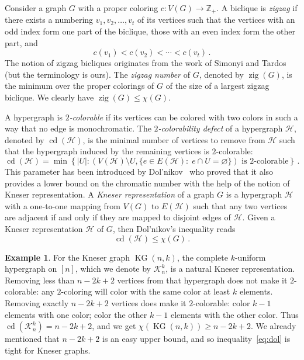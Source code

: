 \documentclass[12pt]{amsart}
\theoremstyle{definition}
\newtheorem{example}{Example}
\def\Z{\mathbb{Z}}
\def\HH{\mathcal{H}}
\renewcommand{\geq}{\geqslant}
\renewcommand{\leq}{\leqslant}
\def\KG{\operatorname{KG}}
\def\cd{\operatorname{cd}}
\def\zig{\operatorname{zig}}
\begin{document}

Consider a graph $G$ with a proper coloring $c \colon V(G) \rightarrow \Z_+$. A biclique is {\em zigzag} if there exists a numbering $v_1, v_2, \ldots, v_t$ of its vertices such that the vertices with an odd index form one part of the biclique, those with an even index form the other part, and 
\[
c(v_1) < c(v_2) < \cdots < c(v_t) \, .
\]
The notion of zigzag bicliques originates from the work of Simonyi and Tardos~\cite{simonyi2006local} (but the terminology is ours). The {\em zigzag number} of $G$, denoted by $\zig(G)$, is the minimum over the proper colorings of $G$ of the size of a largest zigzag biclique. We clearly have $\zig(G) \leq \chi(G)$.

A hypergraph is {\em $2$-colorable} if its vertices can be colored with two colors in such a way that no edge is monochromatic. The {\em $2$-colorability defect} of a hypergraph $\HH$, denoted by $\cd(\HH)$, is the minimal number of vertices to remove from $\HH$ such that the hypergraph induced by the remaining vertices is $2$-colorable:
\[
\cd(\HH)=\min\left\{|U|\colon \left(V(\HH)\setminus U,\{e\in E(\HH)\colon\;e\cap U=\varnothing\}\right)\mbox{ is $2$-colorable}\right\}\, .
\]
This parameter has been introduced by Dol'nikov~\cite{dol1988certain} who proved that it also provides a lower bound on the chromatic number with the help of the notion of Kneser representation. A {\em Kneser representation} of a graph $G$ is a hypergraph $\HH$ with a one-to-one mapping from $V(G)$ to $E(\HH)$ such that any two vertices are adjacent if and only if they are mapped to disjoint edges of $\HH$. Given a Kneser representation $\HH$ of $G$, then Dol'nikov's inequality reads
\begin{equation}\label{eq:dol}
\cd(\HH) \leq \chi(G)\, .
\end{equation}

\begin{example}
For the Kneser graph $\KG(n,k)$, the complete $k$-uniform hypergraph on $[n]$, which we denote by $\mathcal{K}_n^k$, is a natural Kneser representation. Removing less than $n-2k+2$ vertices from that hypergraph does not make it $2$-colorable: any $2$-coloring will color with the same color at least $k$ elements. Removing exactly $n-2k+2$ vertices does make it $2$-colorable: color $k-1$ elements with one color; color the other $k-1$ elements with the other color. Thus $\cd(\mathcal{K}_n^k)=n-2k+2$, and we get $\chi(\KG(n,k))\geq n-2k+2$. We already mentioned that $n-2k+2$ is an easy upper bound, and so inequality~\eqref{eq:dol} is tight for Kneser graphs.
\end{example}
\end{document}
